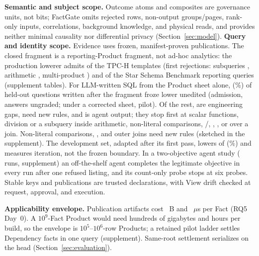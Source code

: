 \documentclass[10pt,journal,compsoc]{IEEEtran}
\newcommand{\system}{FactGate\xspace}
\newcommand{\code}[1]{\texttt{\detokenize{#1}}}
\begin{document}
\textbf{Semantic and subject scope.} Outcome atoms and composites are
governance units, not bits; \system omits rejected rows, non-output
groups/pages, rank-only inputs, correlations, background knowledge, and
physical reads, and provides neither minimal causality nor differential
privacy (Section~\ref{sec:model}). \textbf{Query and identity scope.} Evidence uses
frozen, manifest-proven publications. The closed fragment is a
reporting-Product fragment, not ad-hoc analytics: the production lowerer
admits \TPCHLowerableExplicitJoin{} of the \TPCHQueries{} TPC-H templates
(first rejections: subqueries
\TPCHSubqueryQueries{}, arithmetic \TPCHArithmeticQueries{}, multi-product
\code{LIMIT}) and
\SSBLowerableExplicitJoin{} of the \SSBQueries{} Star Schema Benchmark
reporting queries (supplement tables).
For LLM-written SQL from the Product sheet alone, \HeldoutLowerable{}
(\HeldoutLowerablePct\%) of \HeldoutQueries{} held-out
questions written after the fragment froze lower unedited (admission, answers ungraded;
\SheetCorrectedRange{} under a corrected sheet, pilot). Of the rest,
\HeldoutEngineeringGaps{} are engineering
gaps, \HeldoutNewRule{} need new rules, and \HeldoutAgentDefects{} is agent output; they stop
first at scalar functions, division or a subquery inside
arithmetic, non-literal comparisons, \code{BETWEEN}/\code{LIKE}, \code{OR},
\code{LEFT JOIN}, or \code{LIMIT} over a join. Non-literal comparisons,
\code{OR}, and outer joins need new rules (sketched in the supplement). The
development set, adapted after its first pass, lowers
\AgentWorkloadLowerable{} of \AgentWorkloadQueries{}
(\AgentWorkloadLowerablePct\%) and measures iteration, not the frozen
boundary. In a two-objective agent study (\AgentRuns{} runs, supplement) an
off-the-shelf agent completes the legitimate objective in every run after one
refused listing, and its count-only probe stops at six probes. Stable keys and
publications are trusted declarations, with View drift checked at request,
approval, and execution.

\textbf{Applicability envelope.} Publication artifacts cost
\RQFiveBytesPerFact{}~B and \RQFiveBuildMicrosPerFact{}~$\mu$s per Fact
(RQ5 Day~0). A $10^9$-Fact Product
would need hundreds of gigabytes and hours per build, so the envelope is $10^5$--$10^6$-row Products; a
retained pilot ladder settles \FinalVFiveScaleSevenLargestDependency{}
Dependency facts in one query (supplement). Same-root
settlement serializes on the head (Section~\ref{sec:evaluation}).
\end{document}
